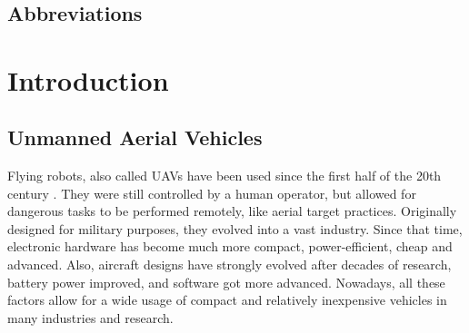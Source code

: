 


\conditionalClearPage



\conditionalClearPage




\conditionalClearPage

\begin{changemargin}{0.8cm}{0.8cm}

~\vfill{}

\section*{Abbreviations}



\vskip 2.5cm

\end{changemargin}

\conditionalClearPage


\tableofcontents

\conditionalClearPage

\pagestyle{full}


\chapter{Introduction}


\section{Unmanned Aerial Vehicles}
Flying robots, also called \acs{UAV}s have been used since the first half of the 20th century \cite{keane2013brief}. They were still controlled by a human operator, but allowed for dangerous tasks to be performed remotely, like aerial target practices. Originally designed for military purposes, they evolved into a vast industry. Since that time, electronic hardware has become much more compact, power-efficient, cheap and advanced. Also, aircraft designs have strongly evolved after decades of research, battery power improved, and software got more advanced. Nowadays, all these factors allow for a wide usage of compact and relatively inexpensive vehicles in many industries and research. 

